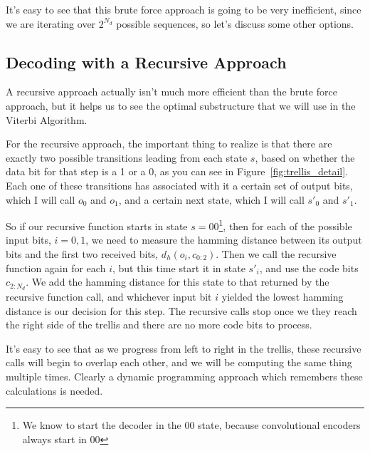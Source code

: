 \documentclass[11pt]{article}
\begin{document}
        It's easy to see that this brute force approach is going to be very
        inefficient, since we are iterating over $2^{N_d}$ possible sequences, so
        let's discuss some other options.

        \subsection{Decoding with a Recursive Approach}
        \label{sec:recursive}
        A recursive approach actually isn't much more efficient than the brute
        force approach, but it helps us to see the optimal substructure that we
        will use in the Viterbi Algorithm.

        For the recursive approach, the important thing to realize is that there
        are exactly two possible transitions leading from each state $s$, based on
        whether the data bit for that step is a 1 or a 0, as you can see in
        Figure~\ref{fig:trellis_detail}.  Each one of these transitions has
        associated with it a certain set of output bits, which I will call
        $o_0$ and $o_1$, and a certain next state, which I will call $s'_0$ and
        $s'_1$.

        So if our recursive function starts in state $s=00$\footnote{We know to start the decoder in
        the 00 state, because convolutional encoders always start in 00}, then 
        for each of the possible input bits, $i={0,1}$, we need to measure the
        hamming distance between its output bits and the first two received bits,
        $d_h(o_i, c_{0:2})$.  Then we call the recursive function again for each $i$, but
        this time start it in state $s'_i$, and use the code bits $c_{2:N_d}$.
        We add the hamming distance for this state to that returned by the
        recursive function call, and whichever input bit $i$ yielded the lowest
        hamming distance is our decision for this step.  The recursive calls stop
        once we they reach the right side of the trellis and there are no more
        code bits to process.

        It's easy to see that as we progress from left to right in the trellis,
        these recursive calls will begin to overlap each other, and we will be
        computing the same thing multiple times. Clearly a dynamic programming
        approach which remembers these calculations is needed.
\end{document}
